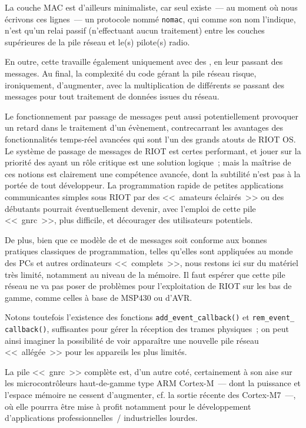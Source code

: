 La couche MAC est d'ailleurs minimaliste, car seul existe~--- au moment
où nous écrivons ces lignes~--- un protocole nommé \texttt{nomac}, qui
comme son nom l'indique, n'est qu'un relai passif (n'effectuant aucun
traitement) entre les couches supérieures de la pile réseau et le(s)
pilote(s) radio.

En outre, cette  travaille également uniquement avec
des , en leur passant des messages. Au final, la complexité
du code gérant la pile réseau risque, ironiquement, d'augmenter, avec
la multiplication de  différents se passant des messages
pour tout traitement de données issues du réseau.

Le fonctionnement par passage de messages peut aussi potentiellement
provoquer un retard dans le traitement d'un évènement, contrecarrant
les avantages des fonctionnalités temps-réel avancées qui sont l'un
des grands atouts de RIOT OS. Le système de passage de messages de RIOT
est certes performant, et jouer sur la priorité des 
ayant un rôle critique est une solution logique~; mais la maîtrise
de ces notions est clairement une compétence avancée, dont la subtilité
n'est pas à la portée de tout développeur. La programmation rapide
de petites applications communicantes simples sous RIOT par des
<<~amateurs éclairés~>> ou des débutants pourrait éventuellement
devenir, avec l'emploi de cette pile <<~gnrc~>>, plus difficile,
et décourager des utilisateurs potentiels.

De plus, bien que ce modèle de  et de messages soit conforme
aux bonnes pratiques classiques de programmation, telles qu'elles sont
appliquées au monde des PCs et autres ordinateurs <<~complets~>>, nous
restons ici sur du matériel très limité, notamment au niveau de la mémoire.
Il faut espérer que cette pile réseau ne va pas poser de problèmes pour
l'exploitation de RIOT sur les  bas de gamme, comme celles
à base de MSP430 ou d'AVR.

\medskip

Notons toutefois l'existence des fonctions \texttt{add\_event\_callback()}
et \texttt{rem\_event\_ callback()}, suffisantes pour gérer la réception des
trames physiques~; on peut ainsi imaginer la possibilité de voir
apparaître une nouvelle pile réseau <<~allégée~>> pour les appareils les
plus limités.

La pile <<~gnrc~>> complète est, d'un autre coté, certainement à son aise
sur les microcontrôleurs haut-de-gamme type ARM Cortex-M~--- dont la
puissance et l'espace mémoire ne cessent d'augmenter, cf. la sortie récente
des Cortex-M7~---, où elle pourrra être mise à profit notamment pour le
développement d'applications professionnelles~/ industrielles lourdes.


